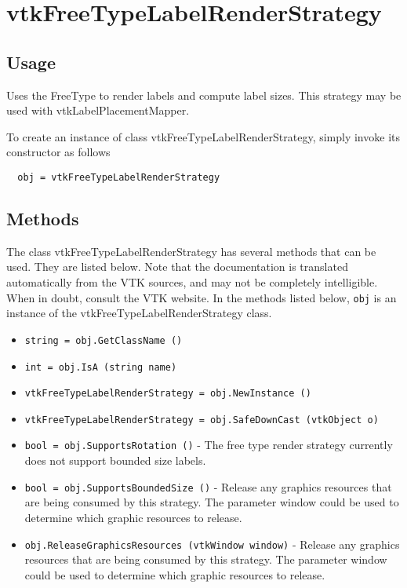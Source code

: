 \section{vtkFreeTypeLabelRenderStrategy}

\subsection{Usage}

 Uses the FreeType to render labels and compute label sizes.
 This strategy may be used with vtkLabelPlacementMapper.

To create an instance of class vtkFreeTypeLabelRenderStrategy, simply
invoke its constructor as follows
\begin{verbatim}
  obj = vtkFreeTypeLabelRenderStrategy
\end{verbatim}
\subsection{Methods}

The class vtkFreeTypeLabelRenderStrategy has several methods that can be used.
  They are listed below.
Note that the documentation is translated automatically from the VTK sources,
and may not be completely intelligible.  When in doubt, consult the VTK website.
In the methods listed below, \verb|obj| is an instance of the vtkFreeTypeLabelRenderStrategy class.
\begin{itemize}
\item  \verb|string = obj.GetClassName ()|

\item  \verb|int = obj.IsA (string name)|

\item  \verb|vtkFreeTypeLabelRenderStrategy = obj.NewInstance ()|

\item  \verb|vtkFreeTypeLabelRenderStrategy = obj.SafeDownCast (vtkObject o)|

\item  \verb|bool = obj.SupportsRotation ()| -  The free type render strategy currently does not support bounded size labels.

\item  \verb|bool = obj.SupportsBoundedSize ()| -  Release any graphics resources that are being consumed by this strategy.
 The parameter window could be used to determine which graphic
 resources to release.

\item  \verb|obj.ReleaseGraphicsResources (vtkWindow window)| -  Release any graphics resources that are being consumed by this strategy.
 The parameter window could be used to determine which graphic
 resources to release.

\end{itemize}
